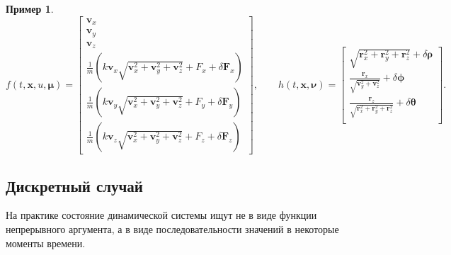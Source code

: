 \documentclass[12pt]{article}
\newtheorem{example}[theorem]{Пример}
\begin{document}
\begin{example}
    \begin{equation}
        f(t,\pmb{x},u,\pmb{\mu})=\begin{bmatrix}
            \pmb{v}_x                                                                                   \\
            \pmb{v}_y                                                                                   \\
            \pmb{v}_z                                                                                   \\
            \frac{1}{m}(k \pmb{v}_x\sqrt{\pmb{v}_x^2+\pmb{v}_y^2+\pmb{v}_z^2} + F_x + \delta \pmb{F}_x) \\
            \frac{1}{m}(k \pmb{v}_y\sqrt{\pmb{v}_x^2+\pmb{v}_y^2+\pmb{v}_z^2} + F_y + \delta \pmb{F}_y) \\
            \frac{1}{m}(k \pmb{v}_z\sqrt{\pmb{v}_x^2+\pmb{v}_y^2+\pmb{v}_z^2} + F_z + \delta \pmb{F}_z)
        \end{bmatrix},
        \qquad
        h(t,\pmb{x},\pmb{\nu})=\begin{bmatrix}
            \sqrt{\pmb{r}_x^2+\pmb{r}_y^2+\pmb{r}_z^2} + \delta\pmb{\rho}                         \\
            \frac{\pmb{r}_x}{\sqrt{\pmb{v}_y^2+\pmb{v}_z^2}} + \delta\pmb{\phi}                   \\
            \frac{\pmb{r}_z}{\sqrt{\pmb{r}_x^2 + \pmb{r}_y^2 + \pmb{r}_z^2}} + \delta\pmb{\theta} \\
        \end{bmatrix}.
    \end{equation}
\end{example}

\subsection{Дискретный случай}
\label{SubsectionDiscreteCase}

На практике состояние динамической системы ищут не в виде функции непрерывного
аргумента, а в виде последовательности значений в некоторые моменты времени.
\end{document}
